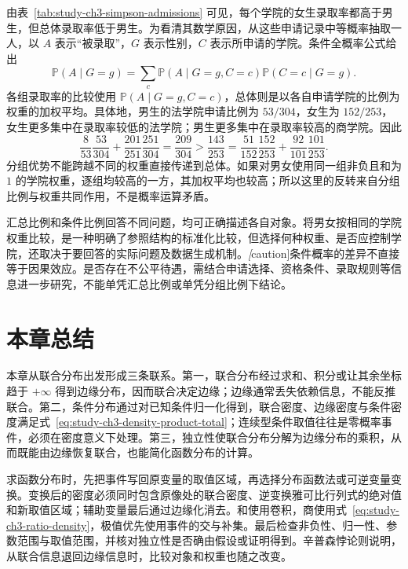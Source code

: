 由表~\ref{tab:study-ch3-simpson-admissions} 可见，每个学院的女生录取率都高于男生，但总体录取率低于男生。为看清其数学原因，从这些申请记录中等概率抽取一人，以 $A$ 表示“被录取”，$G$ 表示性别，$C$ 表示所申请的学院。条件全概率公式给出
\begin{equation}
  \mathbb P(A\mid G=g)
  =\sum_c\mathbb P(A\mid G=g,C=c)\mathbb P(C=c\mid G=g).
  \label{eq:study-ch3-simpson-total-probability}
\end{equation}
各组录取率的比较使用 $\mathbb P(A\mid G=g,C=c)$，总体则是以各自申请学院的比例为权重的加权平均。具体地，男生的法学院申请比例为 $53/304$，女生为 $152/253$，女生更多集中在录取率较低的法学院；男生更多集中在录取率较高的商学院。因此
\[
  \frac8{53}\frac{53}{304}+\frac{201}{251}\frac{251}{304}
  =\frac{209}{304}
  >\frac{143}{253}
  =\frac{51}{152}\frac{152}{253}+\frac{92}{101}\frac{101}{253}.
\]
分组优势不能跨越不同的权重直接传递到总体。如果对男女使用同一组非负且和为 $1$ 的学院权重，逐组均较高的一方，其加权平均也较高；所以这里的反转来自分组比例与权重共同作用，不是概率运算矛盾。

汇总比例和条件比例回答不同问题，均可正确描述各自对象。将男女按相同的学院权重比较，是一种明确了参照结构的标准化比较，但选择何种权重、是否应控制学院，还取决于要回答的实际问题及数据生成机制。\emph[caution]{条件概率的差异不直接等于因果效应。}是否存在不公平待遇，需结合申请选择、资格条件、录取规则等信息进一步研究，不能单凭汇总比例或单凭分组比例下结论。

\section*{本章总结}

本章从联合分布出发形成三条联系。第一，联合分布经过求和、积分或让其余坐标趋于 $+\infty$ 得到边缘分布，因而联合决定边缘；边缘通常丢失依赖信息，不能反推联合。第二，条件分布通过对已知条件归一化得到，联合密度、边缘密度与条件密度满足式~\eqref{eq:study-ch3-density-product-total}；连续型条件取值往往是零概率事件，必须在密度意义下处理。第三，独立性使联合分布分解为边缘分布的乘积，从而既能由边缘恢复联合，也能简化函数分布的计算。

求函数分布时，先把事件写回原变量的取值区域，再选择分布函数法或可逆变量变换。变换后的密度必须同时包含原像处的联合密度、逆变换雅可比行列式的绝对值和新取值区域；辅助变量最后通过边缘化消去。和使用卷积，商使用式~\eqref{eq:study-ch3-ratio-density}，极值优先使用事件的交与补集。最后检查非负性、归一性、参数范围与取值范围，并核对独立性是否确由假设或证明得到。辛普森悖论则说明，从联合信息退回边缘信息时，比较对象和权重也随之改变。


